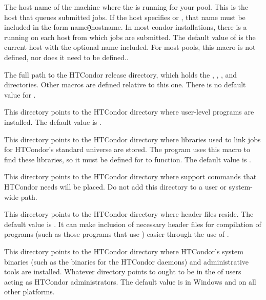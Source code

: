 \begin{description}
\label{param:ScheddHost}
\item[\Macro{SCHEDD\_HOST}]
  The host name of the machine where the  is running for
  your pool.  This is the host that queues submitted jobs.
  If the host specifies  or , that
  name must be included in the form name\verb$@$hostname.
  In most condor installations, there is a  running on
  each host from which jobs are submitted.  The default value of
   is the current host with the optional name included.  For most pools, this
  macro is not defined, nor does it need to be defined..

\label{param:ReleaseDir}
\item[\Macro{RELEASE\_DIR}]
  The full path to
  the HTCondor release directory, which holds the ,
  , , and  directories.  Other macros
  are defined relative to this one.  There is no default value for
  .

\label{param:Bin}
\item[\Macro{BIN}]
  This directory points to the
  HTCondor directory where user-level programs are installed.
  The default value is .
  
\label{param:Lib}
\item[\Macro{LIB}]
  This directory points to the
  HTCondor directory where libraries used to link jobs for HTCondor's
  standard universe are stored.  The  program uses
  this macro to find these libraries, so it must be defined for
   to function.
  The default value is .

\label{param:LibExec}
\item[\Macro{LIBEXEC}]
  This directory points
  to the HTCondor directory where support commands that HTCondor
  needs will be placed.
  Do not add this directory to a user or system-wide path.

\label{param:Include}
\item[\Macro{INCLUDE}]
  This directory points to the HTCondor directory where header files reside.
  The default value is .
  It can make inclusion of necessary header files
  for compilation of programs (such as those programs
  that use )
  easier through the use of .

\label{param:Sbin}
\item[\Macro{SBIN}]
  This directory points to the
  HTCondor directory where HTCondor's system binaries (such as the
  binaries for the HTCondor daemons) and administrative tools are
  installed.  Whatever directory  points to ought
  to be in the  of users acting as HTCondor
  administrators.
  The default value is  in Windows and
   on all other platforms.


\end{description}

